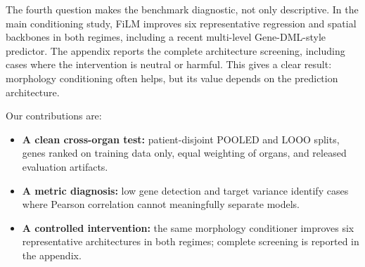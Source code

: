 The fourth question makes the benchmark diagnostic, not only descriptive. In the main conditioning
study, FiLM improves six representative regression and spatial backbones in both regimes, including
a recent multi-level Gene-DML-style predictor. The
appendix reports the complete architecture screening, including cases where the intervention is neutral
or harmful. This gives a clear result: morphology conditioning often helps, but its value depends on
the prediction architecture.

Our contributions are:
\begin{itemize}
  \item \textbf{A clean cross-organ test:} patient-disjoint POOLED and LOOO splits, genes ranked on
  training data only, equal weighting of organs, and released evaluation artifacts.
  \item \textbf{A metric diagnosis:} low gene detection and target variance identify cases where
  Pearson correlation cannot meaningfully separate models.
  \item \textbf{A controlled intervention:} the same morphology conditioner improves six
  representative architectures in both regimes; complete screening is reported in the appendix.
\end{itemize}
